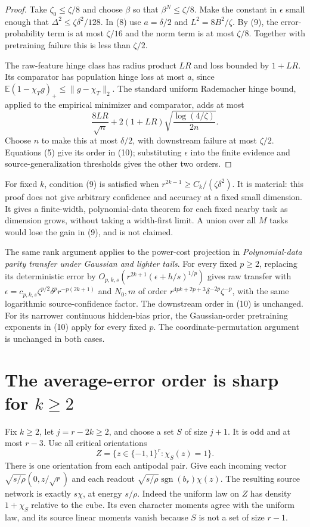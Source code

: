 \documentclass[11pt]{article}
\newcommand{\E}{\mathbb E}\newcommand{\R}{\mathbb R}
\begin{document}
\begin{proof}
Take $\zeta_0\le\zeta/8$ and choose $\beta$ so that
$\beta^N\le\zeta/8$. Make the constant in $\epsilon$ small enough
that $\Delta^2\le\zeta\delta^2/128$.
In (8) use $a=\delta/2$ and $L^2=8B^2/\zeta$.
By (9), the error-probability term is at most $\zeta/16$ and the
norm term is at most $\zeta/8$. Together with pretraining failure this
is less than $\zeta/2$.

The raw-feature hinge class has radius product $LR$ and loss bounded
by $1+LR$. Its comparator has population hinge loss at most $a$, since
$\E(1-\chi_Tg)_+\le\|g-\chi_T\|_2$.
The standard uniform Rademacher hinge bound, applied to the empirical
minimizer and comparator, adds at most
\[
 \frac{8LR}{\sqrt n}
       +2(1+LR)\sqrt{\frac{\log(4/\zeta)}{2n}}.
\]
Choose $n$ to make this at most $\delta/2$, with downstream failure
at most $\zeta/2$. Equations (5) give its order in (10); substituting
$\epsilon$ into the finite evidence and source-generalization thresholds
gives the other two orders.
\end{proof}

For fixed $k$, condition (9) is satisfied when
$r^{2k-1}\ge C_k/(\zeta\delta^2)$. It is material: this proof does
not give arbitrary confidence and accuracy at a fixed small dimension.
It gives a finite-width, polynomial-data theorem for each fixed nearby
task as dimension grows, without taking a width-first limit.
A union over all $M$ tasks would lose the gain in (9), and is not claimed.

The same rank argument applies to the power-cost projection in
\emph{Polynomial-data parity transfer under Gaussian and lighter tails}.
For every fixed $p\ge2$, replacing its deterministic error by
$O_{p,k,s}(r^{2k+1}(\epsilon+h/s)^{1/p})$ gives raw transfer with
$\epsilon=c_{p,k,s}\zeta^{p/2}\delta^p r^{-p(2k+1)}$ and
$N_0,m$ of order $r^{4pk+2p+3}\delta^{-2p}\zeta^{-p}$, with the
same logarithmic source-confidence factor. The downstream order in (10)
is unchanged. For its narrower continuous hidden-bias prior, the
Gaussian-order pretraining exponents in (10) apply for every fixed $p$.
The coordinate-permutation argument is unchanged in both cases.

\section{The average-error order is sharp for $k\ge2$}
Fix $k\ge2$, let $j=r-2k\ge2$, and choose a set $S$ of size $j+1$.
It is odd and at most $r-3$. Use all critical orientations
\[
                 Z=\{z\in\{-1,1\}^r:\chi_S(z)=1\}.
\]
There is one orientation from each antipodal pair. Give each incoming
vector $\sqrt{s/\rho}(0,z/\sqrt r)$ and each readout
$\sqrt{s/\rho}\operatorname{sgn}(b_r)\chi(z)$.
The resulting source network is exactly $s\chi$, at energy $s/\rho$.
Indeed the uniform law on $Z$ has density $1+\chi_S$ relative to the
cube. Its even character moments agree with the uniform law, and its
source linear moments vanish because $S$ is not a set of size $r-1$.
\end{document}
